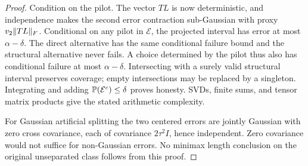 \begin{proof}
Condition on the pilot. The vector $TL$ is now deterministic, and independence makes the second error contraction sub-Gaussian with proxy $v_2\lVert TL\rVert_F$. Conditional on any pilot in $\mathcal E$, the projected interval has error at most $\alpha-\delta$. The direct alternative has the same conditional failure bound and the structural alternative never fails. A choice determined by the pilot thus also has conditional failure at most $\alpha-\delta$. Intersecting with a surely valid structural interval preserves coverage; empty intersections may be replaced by a singleton. Integrating and adding $\mathbb P(\mathcal E^c)\le\delta$ proves honesty. SVDs, finite sums, and tensor matrix products give the stated arithmetic complexity.

For Gaussian artificial splitting the two centered errors are jointly Gaussian with zero cross covariance, each of covariance $2\tau^2I$, hence independent. Zero covariance would not suffice for non-Gaussian errors. No minimax length conclusion on the original unseparated class follows from this proof.
\end{proof}
